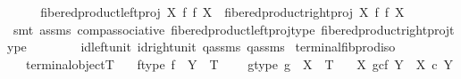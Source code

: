 \begin{isabellebody}
\ \ \isamarkupfalse%
\ \isamarkupfalse%
\ {\isachardoublequoteopen}fibered{\isacharunderscore}{\kern0pt}product{\isacharunderscore}{\kern0pt}left{\isacharunderscore}{\kern0pt}proj\ X\ f\ f\ X\ {\isacharequal}{\kern0pt}\ fibered{\isacharunderscore}{\kern0pt}product{\isacharunderscore}{\kern0pt}right{\isacharunderscore}{\kern0pt}proj\ X\ f\ f\ X{\isachardoublequoteclose}\isanewline
\ \ \ \ \isamarkupfalse%
\ {\isacharparenleft}{\kern0pt}smt\ assms{\isacharparenleft}{\kern0pt}{}{\isacharparenright}{\kern0pt}\ comp{\isacharunderscore}{\kern0pt}associative{}\ fibered{\isacharunderscore}{\kern0pt}product{\isacharunderscore}{\kern0pt}left{\isacharunderscore}{\kern0pt}proj{\isacharunderscore}{\kern0pt}type\ fibered{\isacharunderscore}{\kern0pt}product{\isacharunderscore}{\kern0pt}right{\isacharunderscore}{\kern0pt}proj{\isacharunderscore}{\kern0pt}type\isanewline
\ \ \ \ \ \ \ \ id{\isacharunderscore}{\kern0pt}left{\isacharunderscore}{\kern0pt}unit{}\ id{\isacharunderscore}{\kern0pt}right{\isacharunderscore}{\kern0pt}unit{}\ q{}{\isacharunderscore}{\kern0pt}assms\ q{}{\isacharunderscore}{\kern0pt}assms{\isacharparenright}{\kern0pt}\isanewline
{}\isamarkupfalse%
%
\endisatagproof
{\isafoldproof}%
%
\isadelimproof
\isanewline
%
\endisadelimproof
\isanewline
{}\isamarkupfalse%
\ terminal{\isacharunderscore}{\kern0pt}fib{\isacharunderscore}{\kern0pt}prod{\isacharunderscore}{\kern0pt}iso{\isacharcolon}{\kern0pt}\isanewline
\ \ \ {\isachardoublequoteopen}terminal{\isacharunderscore}{\kern0pt}object{\isacharparenleft}{\kern0pt}T{\isacharparenright}{\kern0pt}{\isachardoublequoteclose}\isanewline
\ \ \ f{\isacharunderscore}{\kern0pt}type{\isacharcolon}{\kern0pt}\ {\isachardoublequoteopen}f\ {\isacharcolon}{\kern0pt}\ Y\ {\isasymrightarrow}\ T{\isachardoublequoteclose}\ \isanewline
\ \ \ g{\isacharunderscore}{\kern0pt}type{\isacharcolon}{\kern0pt}\ {\isachardoublequoteopen}g\ {\isacharcolon}{\kern0pt}\ X\ {\isasymrightarrow}\ T{\isachardoublequoteclose}\isanewline
\ \ \ {\isachardoublequoteopen}{\isacharparenleft}{\kern0pt}X\ \isactrlbsub g\isactrlesub {\isasymtimes}\isactrlsub c\isactrlbsub f\isactrlesub \ Y{\isacharparenright}{\kern0pt}\ {\isasymcong}\ X\ {\isasymtimes}\isactrlsub c\ Y{\isachardoublequoteclose}\isanewline
%
\isadelimproof
%
\endisadelimproof
%
\isatagproof
{}\isamarkupfalse%
\ {\isacharminus}{\kern0pt}\ \isanewline

\end{isabellebody}
